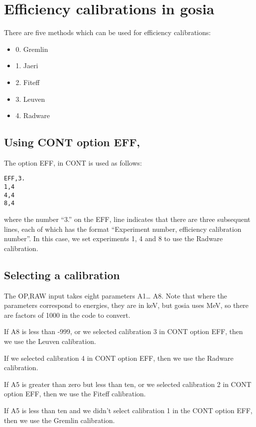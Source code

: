 \chapter{Efficiency calibrations in gosia}
\label{chapt:efficiency}

There are five methods which can be used for efficiency calibrations:\\

\begin{itemize}
\item 0. Gremlin
\item 1. Jaeri
\item 2. Fiteff
\item 3. Leuven
\item 4. Radware
\end{itemize}

\section {Using CONT option EFF,}
The option EFF, in CONT is used as follows:
\begin{verbatim}
EFF,3.
1,4
4,4
8,4
\end{verbatim}

where the number ``3.'' on the EFF, line indicates that there are three
subsequent lines, each of which has the format ``Experiment number,
efficiency calibration number''. In this case, we set experiments 1, 4 and 8
to use the Radware calibration.

\section{Selecting a calibration}

The OP,RAW input takes eight parameters A1{\ldots} A8. Note that where the
parameters correspond to energies, they are in keV, but gosia uses MeV, so
there are factors of 1000 in the code to convert.

If A8 is less than -999, or we selected calibration 3 in CONT option EFF,
then we use the Leuven calibration.

If we selected calibration 4 in CONT option EFF, then we use the Radware
calibration.

If A5 is greater than zero but less than ten, or we selected calibration 2
in CONT option EFF, then we use the Fiteff calibration.

If A5 is less than ten and we didn't select calibration 1 in the CONT option
EFF, then we use the Gremlin calibration.

